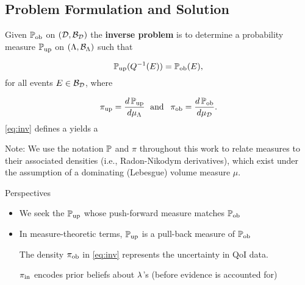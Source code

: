 \subsection{Problem Formulation and Solution}
\begin{frame}[t]

\begin{defn}\label{defn:consistency}
Given $\operatorname*{\mathbb{P}_{ob}}$ on $(\mathcal{D}, \mathcal{B}_{\mathcal{D}})$ the \textbf{inverse problem} is to determine a probability measure $\operatorname*{\mathbb{P}_{up}}$ on $({\Lambda}, \mathcal{B}_{{\Lambda}})$ such that 

	\begin{equation}\label{eq:inv}
		\operatorname*{\mathbb{P}_{up}}(Q^{-1}(E)) = \operatorname*{\mathbb{P}_{ob}}(E),
	\end{equation}
for all events $E \in \mathcal{B}_{\mathcal{D}}$, where

	\begin{equation*}
		\operatorname*{\pi_{up}} = \frac{d\operatorname*{\mathbb{P}_{up}}}{d\mu_{\Lambda}} \;\text{ and }\; \operatorname*{\pi_{ob}} = \frac{d\operatorname*{\mathbb{P}_{ob}}}{d\mu_{\mathcal{D}}}.
	\end{equation*}
\eqref{eq:inv} defines a  yields a 
\end{defn}

Note: {\scriptsize We use the notation $\mathbb{P}$ and $\pi$ throughout this work to relate measures to their associated densities (i.e., Radon-Nikodym derivatives), which exist under the assumption of a dominating (Lebesgue) volume measure $\mu$.}
\end{frame}


\begin{frame}[t]{Perspectives}
\begin{itemize}
	\item We seek the $\operatorname*{\mathbb{P}_{up}}$ whose push-forward measure matches $\operatorname*{\mathbb{P}_{ob}}$
	\item In measure-theoretic terms, $\operatorname*{\mathbb{P}_{up}}$ is a pull-back measure of $\operatorname*{\mathbb{P}_{ob}}$

	\begin{defn}\label{defn:obsden}
		The density $\operatorname*{\pi_{ob}}$ in \eqref{eq:inv} represents the uncertainty in QoI data.
	\end{defn}

	\begin{defn}\label{defn:initialden}
		$\operatorname*{\pi_{in}}$ encodes prior beliefs about $\lambda$'s (before evidence is accounted for)
	\end{defn}

\end{itemize}

\end{frame}


